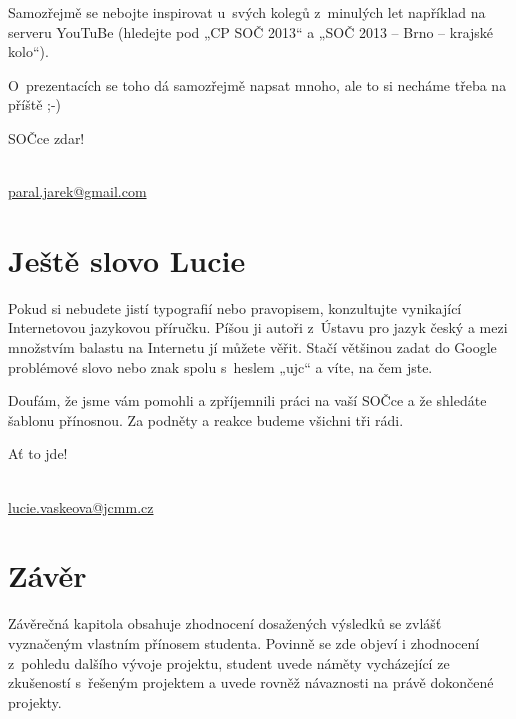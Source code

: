 \documentclass{template/socthesis}
\begin{document}
Samozřejmě se nebojte inspirovat u~svých kolegů z~minulých let například na serveru YouTuBe (hledejte pod „CP SOČ 2013“ a „SOČ 2013 – Brno – krajské kolo“).

O~prezentacích se toho dá samozřejmě napsat mnoho, ale to si necháme třeba na příště ;-)

\vspace{\baselineskip}
\noindent SOČce zdar!

\vspace{\baselineskip}
\noindent {}\\
\url{paral.jarek@gmail.com}

\section{Ještě slovo Lucie}
Pokud si nebudete jistí typografií nebo pravopisem, konzultujte vynikající Internetovou jazykovou příručku. Píšou ji autoři z~Ústavu pro jazyk český a mezi množstvím balastu na Internetu jí můžete věřit. Stačí většinou zadat do Google problémové slovo nebo znak spolu s~heslem „ujc“ a víte, na čem jste.

Doufám, že jsme vám pomohli a zpříjemnili práci na vaší SOČce a že shledáte šablonu přínosnou. Za podněty a reakce budeme všichni tři rádi.

\vspace{\baselineskip}
\noindent Ať to jde!

\vspace{\baselineskip}
\noindent {} \\
\url{lucie.vaskeova@jcmm.cz}

\newpage
\section*{Závěr}

Závěrečná kapitola obsahuje zhodnocení dosažených výsledků se zvlášť vyznačeným vlastním přínosem studenta. Povinně se zde objeví i zhodnocení z~pohledu dalšího vývoje projektu, student uvede náměty vycházející ze zkušeností s~řešeným projektem a uvede rovněž návaznosti na právě dokončené projekty.

\newpage
\printbibliography[title=Literatura]

\listoffigures
{}

\listoftables
{}

\listoflistedequation
{}
\end{document}
